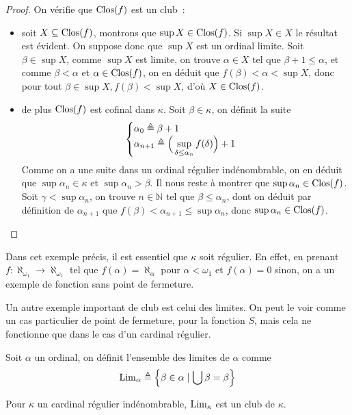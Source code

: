 \begin{proof}
  On vérifie que $\operatorname{Clos}(f)$ est un club~:
  \begin{itemize}
  \item soit $X\subseteq \operatorname{Clos}(f)$, montrons que $\sup X \in \operatorname{Clos}(f)$. Si
    $\sup X \in X$ le résultat est évident. On suppose donc que $\sup X$ est un
    ordinal limite. Soit $\beta \in \sup X$, comme $\sup X$ est limite,
    on trouve $\alpha \in X$ tel que $\beta + 1 \leq \alpha$, et comme
    $\beta < \alpha$ et $\alpha \in \operatorname{Clos}(f)$, on en déduit que
    $f(\beta) < \alpha < \sup X$, donc pour tout
    $\beta \in \sup X, f(\beta) < \sup X$, d'où $X\in \operatorname{Clos}(f)$.
  \item de plus $\operatorname{Clos}(f)$ est cofinal dans $\kappa$. Soit $\beta\in\kappa$, on
    définit la suite
    \[\begin{cases}
    \alpha_0 \triangleq \beta + 1 \\
    \alpha_{n+1} \triangleq \displaystyle
    \Big(\sup_{\delta \leq \alpha_n} f(\delta)\Big) + 1
    \end{cases}\]
    Comme on a une suite dans un ordinal régulier indénombrable, on en déduit
    que $\sup \alpha_n \in \kappa$ et $\sup \alpha_n > \beta$. Il nous reste à
    montrer que $\sup \alpha_n \in \operatorname{Clos}(f)$. Soit $\gamma < \sup \alpha_n$, on
    trouve $n \in \mathbb N$ tel que $\beta \leq \alpha_n$, dont on déduit par
    définition de $\alpha_{n+ 1}$ que $f(\beta) < \alpha_{n+1}\leq \sup\alpha_n$,
    donc $\sup\alpha_n\in\operatorname{Clos}(f)$.
  \end{itemize}
\end{proof}

Dans cet exemple précis, il est essentiel que $\kappa$ soit régulier. En effet,
en prenant $f : \aleph_{\omega_1} \to \aleph_{\omega_1}$ tel que
$f(\alpha) = \aleph_\alpha$ pour $\alpha < \omega_1$ et $f(\alpha) = 0$ sinon,
on a un exemple de fonction sans point de fermeture.

Un autre exemple important de club est celui des limites. On peut le voir comme
un cas particulier de point de fermeture, pour la fonction $S$, mais cela ne
fonctionne que dans le cas d'un cardinal régulier.

\begin{definition}
  Soit $\alpha$ un ordinal, on définit l'ensemble des limites de $\alpha$ comme
  \[\operatorname{Lim}_\alpha \triangleq
  \left\{\beta \in \alpha \mid \bigcup \beta = \beta\right\}\]
\end{definition}

\begin{proposition}
  Pour $\kappa$ un cardinal régulier indénombrable, $\operatorname{Lim}_\kappa$ est un club
  de $\kappa$.
\end{proposition}

